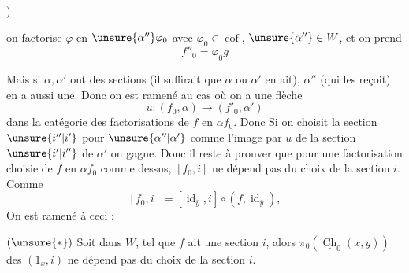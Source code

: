 )


on factorise $\varphi$ en $\unsure{\alpha''}\varphi_0$ avec $\varphi_0\in\operatorname{cof}$, $\unsure{\alpha''}\in W$, et on prend
\[f''_0=\varphi_0 g\]

Mais si $\alpha,\alpha'$ ont des sections (il suffirait que $\alpha$ ou $\alpha'$ en ait),    $\alpha''$ (qui les reçoit) en a aussi une. Donc on est ramené au cas où on a une flèche
\[u:(f_0,\alpha)\longrightarrow(f'_0,\alpha')\]
dans la catégorie des factorisations de $f$ en $\alpha f_0$. Donc \uline{Si} on choisit la section $\unsure{i''|i'}$ pour $\unsure{\alpha''|\alpha'}$ comme l'image par $u$ de la section $\unsure{i'|i''}$ de $\alpha'$ \unsure{,} on gagne. Donc il reste à prouver que
pour une factorisation choisie de $f$ en $\alpha f_0$ comme dessus, $[f_0,i]$ ne dépend pas du choix de la section $i$. Comme
\[[f_0,i]=[\operatorname{id}_{\bar y},i]\circ(f,\operatorname{id}_{\bar y}),\]
On est ramené à ceci :

$(\unsure{*})$ Soit
dans $W$, tel que $f$ ait une  section $i$, alors    $\pi_0(\underline{\operatorname{Ch}}_0(x,y))$  des $(1_x,i)$
ne dépend pas du choix de la section $i$.

